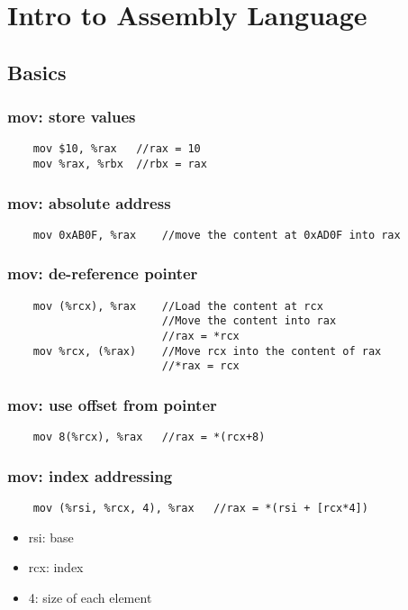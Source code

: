 \documentclass{article}
\begin{document}
\newpage
\section{Intro to Assembly Language}
\subsection{Basics }
\subsubsection*{mov: store values}
\begin{verbatim}
    mov $10, %rax   //rax = 10
    mov %rax, %rbx  //rbx = rax
\end{verbatim}

\subsubsection*{mov: absolute address}
\begin{verbatim}
    mov 0xAB0F, %rax    //move the content at 0xAD0F into rax
\end{verbatim}

\subsubsection*{mov: de-reference pointer}
\begin{verbatim}
    mov (%rcx), %rax    //Load the content at rcx
                        //Move the content into rax
                        //rax = *rcx
    mov %rcx, (%rax)    //Move rcx into the content of rax
                        //*rax = rcx
\end{verbatim}

\subsubsection*{mov: use offset from pointer}
\begin{verbatim}
    mov 8(%rcx), %rax   //rax = *(rcx+8)
\end{verbatim}

\subsubsection*{mov: index addressing}
\begin{verbatim}
    mov (%rsi, %rcx, 4), %rax   //rax = *(rsi + [rcx*4])
\end{verbatim}
\begin{itemize}
    \item rsi: base
    \item rcx: index
    \item 4: size of each element
\end{itemize}
\end{document}
